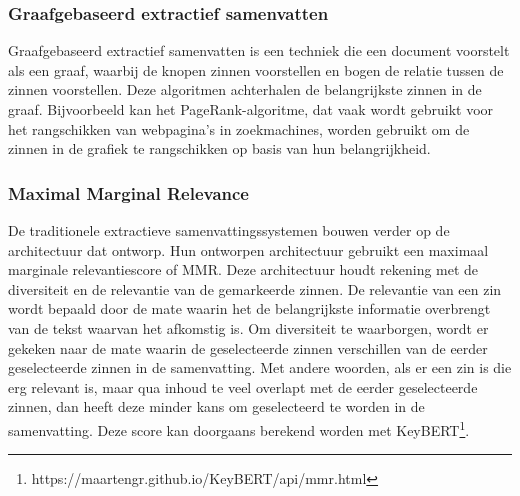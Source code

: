 
\subsubsection{Graafgebaseerd extractief samenvatten}

Graafgebaseerd extractief samenvatten is een techniek die een document voorstelt als een graaf, waarbij de knopen zinnen voorstellen en bogen de relatie tussen de zinnen voorstellen. Deze algoritmen achterhalen de belangrijkste zinnen in de graaf. Bijvoorbeeld kan het PageRank-algoritme, dat vaak wordt gebruikt voor het rangschikken van webpagina's in zoekmachines, worden gebruikt om de zinnen in de grafiek te rangschikken op basis van hun belangrijkheid.

\textcite{AbdelSalam2022} %

\subsubsection{Maximal Marginal Relevance}

De traditionele extractieve samenvattingssystemen bouwen verder op de architectuur dat \textcite{Carbonell1998} ontworp. Hun ontworpen architectuur gebruikt een maximaal marginale relevantiescore of MMR. Deze architectuur houdt rekening met de diversiteit en de relevantie van de gemarkeerde zinnen. De relevantie van een zin wordt bepaald door de mate waarin het de belangrijkste informatie overbrengt van de tekst waarvan het afkomstig is. Om diversiteit te waarborgen, wordt er gekeken naar de mate waarin de geselecteerde zinnen verschillen van de eerder geselecteerde zinnen in de samenvatting. Met andere woorden, als er een zin is die erg relevant is, maar qua inhoud te veel overlapt met de eerder geselecteerde zinnen, dan heeft deze minder kans om geselecteerd te worden in de samenvatting. Deze score kan doorgaans berekend worden met KeyBERT\footnote{https://maartengr.github.io/KeyBERT/api/mmr.html}.

